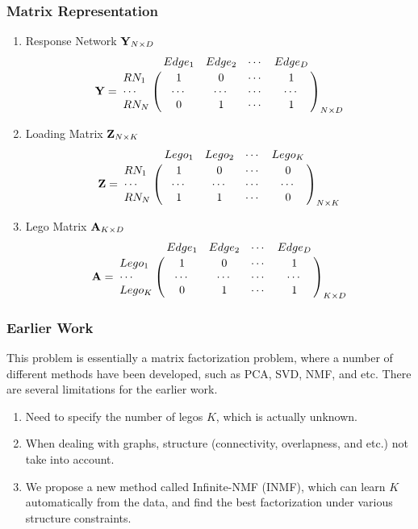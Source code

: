 \documentclass{beamer}
\newcommand{\A}{{\bf A}}
\newcommand{\Y}{{\bf Y}}
\newcommand{\Z}{{\bf Z}}
\begin{document}
\begin{frame}
\frametitle{Matrix Representation}
\fontsize{6pt}{7.2}\selectfont
\begin{enumerate}
	\item Response Network $\Y_{N \times D}$
$$\Y = \bordermatrix{~ & Edge_1 & Edge_2 & \cdots & Edge_D\cr
                  RN_1 & 1 & 0 & \cdots & 1\cr
                  \cdots & \cdots & \cdots & \cdots & \cdots \cr
                  RN_N & 0 & 1 & \cdots & 1 \cr}_{N \times D}$$	
	\item Loading Matrix $\Z_{N \times K}$
$$\Z = \bordermatrix{~ & Lego_1 & Lego_2 & \cdots & Lego_K\cr
                  RN_1 & 1 & 0 & \cdots & 0\cr
                  \cdots & \cdots & \cdots & \cdots & \cdots \cr
                  RN_N & 1 & 1 & \cdots & 0 \cr}_{N \times K}$$	
	\item Lego Matrix $\A_{K \times D}$
$$\A = \bordermatrix{~ & Edge_1 & Edge_2 & \cdots & Edge_D\cr
                  Lego_1 & 1 & 0 & \cdots & 1\cr
                  \cdots & \cdots & \cdots & \cdots & \cdots \cr
                  Lego_K & 0 & 1 & \cdots & 1 \cr}_{K \times D}$$	
\end{enumerate}	

\end{frame}

\begin{frame}
\frametitle{Earlier Work}
This problem is essentially a matrix factorization problem, where a number of different methods have been developed, such as PCA, SVD, NMF, and etc. There are several limitations for the earlier work.
\begin{enumerate}
	\item Need to specify the number of legos $K$, which is actually unknown.
	\item When dealing with graphs, structure (connectivity, overlapness, and etc.) not take into account.
	\item We propose a new method called Infinite-NMF (INMF), which can learn $K$ automatically from the data, and find the best factorization under various structure constraints.
\end{enumerate}

\end{frame}
\end{document}
